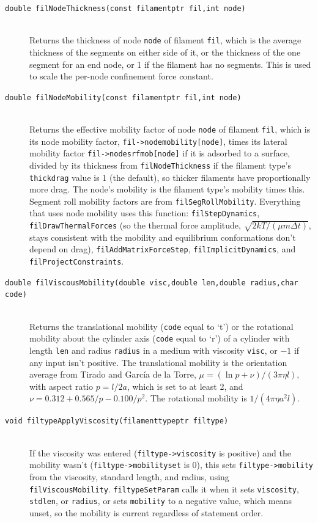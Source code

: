 \documentclass {scrbook}
\newcommand {\ttt} {\texttt}
\begin{document}
\begin{description}
\item[\ttt{double filNodeThickness(const filamentptr fil,int node)}]
\hfill \\
Returns the thickness of node \ttt{node} of filament \ttt{fil}, which is the average thickness of the segments on either side of it, or the thickness of the one segment for an end node, or 1 if the filament has no segments. This is used to scale the per-node confinement force constant.

\item[\ttt{double filNodeMobility(const filamentptr fil,int node)}]
\hfill \\
Returns the effective mobility factor of node \ttt{node} of filament \ttt{fil}, which is its node mobility factor, \ttt{fil->nodemobility[node]}, times its lateral mobility factor \ttt{fil->nodesrfmob[node]} if it is adsorbed to a surface, divided by its thickness from \ttt{filNodeThickness} if the filament type's \ttt{thickdrag} value is 1 (the default), so thicker filaments have proportionally more drag. The node's mobility is the filament type's mobility times this. Segment roll mobility factors are from \ttt{filSegRollMobility}. Everything that uses node mobility uses this function: \ttt{filStepDynamics}, \ttt{filDrawThermalForces} (so the thermal force amplitude, $\sqrt{2kT/(\mu m\Delta t)}$, stays consistent with the mobility and equilibrium conformations don't depend on drag), \ttt{filAddMatrixForceStep}, \ttt{filImplicitDynamics}, and \ttt{filProjectConstraints}.

\item[\ttt{double filViscousMobility(double visc,double len,double radius,char code)}]
\hfill \\
Returns the translational mobility (\ttt{code} equal to `t') or the rotational mobility about the cylinder axis (\ttt{code} equal to `r') of a cylinder with length \ttt{len} and radius \ttt{radius} in a medium with viscosity \ttt{visc}, or $-1$ if any input isn't positive. The translational mobility is the orientation average from Tirado and Garc\'{i}a de la Torre, $\mu=(\ln p+\nu)/(3\pi\eta l)$, with aspect ratio $p=l/2a$, which is set to at least 2, and $\nu=0.312+0.565/p-0.100/p^2$. The rotational mobility is $1/(4\pi\eta a^2 l)$.

\item[\ttt{void filtypeApplyViscosity(filamenttypeptr filtype)}]
\hfill \\
If the viscosity was entered (\ttt{filtype->viscosity} is positive) and the mobility wasn't (\ttt{filtype->mobilityset} is 0), this sets \ttt{filtype->mobility} from the viscosity, standard length, and radius, using \ttt{filViscousMobility}. \ttt{filtypeSetParam} calls it when it sets \ttt{viscosity}, \ttt{stdlen}, or \ttt{radius}, or sets \ttt{mobility} to a negative value, which means unset, so the mobility is current regardless of statement order.


\end{description}
\end{document}
